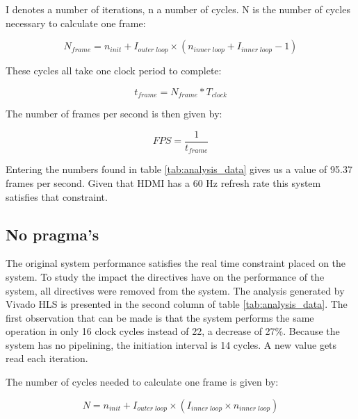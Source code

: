 I denotes a number of iterations, n a number of cycles. N is the number of cycles necessary to calculate one frame:

\begin{equation}
N_{frame} = n_{init} + I_{outer\;loop} \times ( n_{inner\;loop} + I_{inner\;loop} - 1 )
\end{equation}



These cycles all take one clock period to complete:

\begin{equation}\label{eq:frametime}
t_{frame} = N_{frame} * T_{clock}
\end{equation}

The number of frames per second is then given by:

\begin{equation}\label{eq:fps}
FPS = \frac{1}{t_{frame}}
\end{equation}

Entering the numbers found in table \ref{tab:analysis_data} gives us a value of 95.37 frames per second. Given that HDMI has a 60 Hz refresh rate this system satisfies that constraint.


\subsection{No pragma's}
\label{sec:nopragma}

The original system performance satisfies the real time constraint placed on the system. To study the impact the directives have on the performance of the system, all directives were removed from the  system. The analysis generated by Vivado HLS is presented in the second column of table \ref{tab:analysis_data}. The first observation that can be made is that the system performs the same operation in only 16 clock cycles instead of 22, a decrease of 27\%. Because the system has no pipelining, the initiation interval is 14 cycles. A new value gets read each iteration.

The number of cycles needed to calculate one frame is given by:

\begin{equation}
N = n_{init} + I_{outer\;loop} \times (I_{inner\;loop} \times n_{inner\;loop})
\end{equation}



